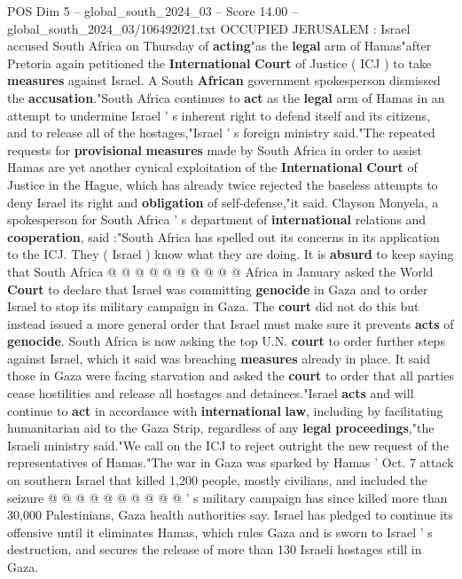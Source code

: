 \begin{textsample}{POS Dim 5 – global\_south\_2024\_03 – Score 14.00 – global\_south\_2024\_03/106492021.txt}  \label{ex:f5_pos_144}
OCCUPIED JERUSALEM : Israel accused South Africa on Thursday of \textbf{acting}"as the \textbf{legal} arm of Hamas"after Pretoria again petitioned the \textbf{International} \textbf{Court} of Justice ( ICJ ) to take \textbf{measures} against Israel.
A South \textbf{African} government spokesperson dismissed the \textbf{accusation}."South Africa continues to \textbf{act} as the \textbf{legal} arm of Hamas in an attempt to undermine Israel ' s inherent right to defend itself and its citizens, and to release all of the hostages,"Israel ' s foreign ministry said."The repeated requests for \textbf{provisional} \textbf{measures} made by South Africa in order to assist Hamas are yet another cynical exploitation of the \textbf{International} \textbf{Court} of Justice in the Hague, which has already twice rejected the baseless attempts to deny Israel its right and \textbf{obligation} of self-defense,"it said.
Clayson Monyela, a spokesperson for South Africa ' s department of \textbf{international} relations and \textbf{cooperation}, said :"South Africa has spelled out its concerns in its application to the ICJ.
They ( Israel ) know what they are doing.
It is \textbf{absurd} to keep saying that South Africa @ @ @ @ @ @ @ @ @ @ Africa in January asked the World \textbf{Court} to declare that Israel was committing \textbf{genocide} in Gaza and to order Israel to stop its military campaign in Gaza.
The \textbf{court} did not do this but instead issued a more general order that Israel must make sure it prevents \textbf{acts} of \textbf{genocide}.
South Africa is now asking the top U.N. \textbf{court} to order further steps against Israel, which it said was breaching \textbf{measures} already in place.
It said those in Gaza were facing starvation and asked the \textbf{court} to order that all parties cease hostilities and release all hostages and detainees."Israel \textbf{acts} and will continue to \textbf{act} in accordance with \textbf{international} \textbf{law}, including by facilitating humanitarian aid to the Gaza Strip, regardless of any \textbf{legal} \textbf{proceedings},"the Israeli ministry said."We call on the ICJ to reject outright the new request of the representatives of Hamas."The war in Gaza was sparked by Hamas ' Oct. 7 attack on southern Israel that killed 1,200 people, mostly civilians, and included the seizure @ @ @ @ @ @ @ @ @ @ ' s military campaign has since killed more than 30,000 Palestinians, Gaza health authorities say.
Israel has pledged to continue its offensive until it eliminates Hamas, which rules Gaza and is sworn to Israel ' s destruction, and secures the release of more than 130 Israeli hostages still in Gaza.

\end{textsample}
